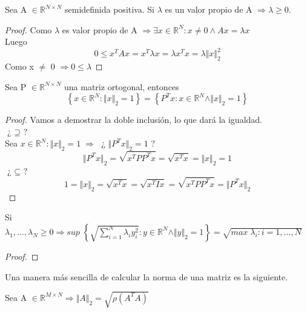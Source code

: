 \begin{nprop}
Sea A $\in \mathbb{R}^{N \times N}$ semidefinida positiva. Si $\lambda$ es un valor propio de A $\Rightarrow \lambda \geq 0$.
\end{nprop}

\begin{proof}
Como $\lambda$ es valor propio de A $\Rightarrow \exists x \in \mathbb{R}^N : x \neq 0 \wedge Ax = \lambda x$\\
Luego\\
\[ 0 \leq x^TAx = x^T \lambda x = \lambda x^Tx = \lambda \Vert x \Vert _2^2 \]
Como x $\neq$ 0 $\Rightarrow 0 \leq \lambda$
\end{proof}

\begin{nprop}
Sea P $\in \mathbb{R}^{N \times N}$ una matriz ortogonal, entonces
\[ \left\lbrace x \in \mathbb{R}^N : \Vert x \Vert _2 = 1 \right\rbrace = \left\lbrace P^Tx : x \in \mathbb{R}^N \wedge \Vert x \Vert _2 = 1 \right\rbrace \]
\end{nprop}

\begin{proof}
Vamos a demostrar la doble inclusión, lo que dará la igualdad.\\
$\textbf{¿ $\supseteq$ ?}$\\
Sea $x \in \mathbb{R}^N : \Vert x \Vert _2 = 1 \; \Rightarrow \;$ ¿ $\Vert P^Tx \Vert _2 = 1 $ ?
\[ \Vert P^Tx \Vert _2 = \sqrt{x^TPP^Tx} = \sqrt{x^Tx} = \Vert x \Vert _2 = 1 \]
$\textbf{¿ $\subseteq$ ?}$\\
\[ 1 = \Vert x \Vert _2 = \sqrt{x^Tx} = \sqrt{x^TIx} = \sqrt{x^TPP^Tx} = \Vert P^Tx \Vert _2 \]
\end{proof}

\begin{nprop}
Si $\lambda _1,..., \lambda _N \geq 0 \Rightarrow sup \; \left\lbrace \sqrt{\sum_{i=1}^N \lambda _iy_i^2} : y \in \mathbb{R}^N \wedge \Vert y \Vert _2 = 1 \right\rbrace = \sqrt{max \; \lambda _i : i = 1,...,N} $
\end{nprop}

\begin{proof}
\end{proof}

Una manera más sencilla de calcular la norma de una matriz es la siguiente.

\begin{nprop}
Sea A $\in \mathbb{R}^{M \times N} \Rightarrow \Vert A \Vert _2 = \sqrt{\rho (A^TA)} $
\end{nprop}

